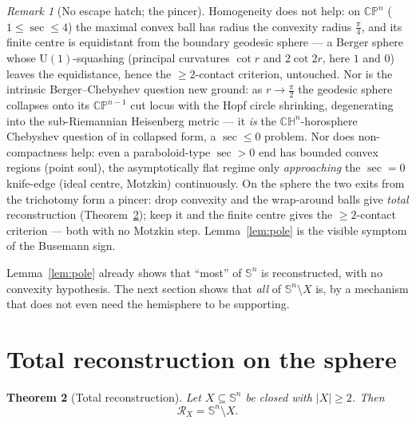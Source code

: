 \documentclass[11pt]{article}
\newtheorem{theorem}{Theorem}[section]
\theoremstyle{remark}
\newtheorem{remark}[theorem]{Remark}
\newcommand{\X}{X}
\newcommand{\Rx}{\mathcal{R}_{\X}}
\newcommand{\Sn}{\mathbb{S}^{n}}
\begin{document}
\begin{remark}[No escape hatch; the pincer]\label{rem:noescape}
Homogeneity does not help: on $\mathbb{CP}^{n}$ ($1\le\sec\le4$) the maximal
convex ball has radius the convexity radius $\tfrac\pi4$, and its finite
centre is equidistant from the boundary geodesic sphere --- a Berger sphere
whose $\mathrm{U}(1)$-squashing (principal curvatures $\cot r$ and
$2\cot 2r$, here $1$ and $0$) leaves the equidistance, hence the
$\ge2$-contact criterion, untouched. Nor is the intrinsic Berger--Chebyshev
question new ground: as $r\to\tfrac\pi2$ the geodesic sphere collapses onto
its $\mathbb{CP}^{n-1}$ cut locus with the Hopf circle shrinking,
degenerating into the sub-Riemannian Heisenberg metric --- it \emph{is} the
$\mathbb{CH}^{n}$-horosphere Chebyshev question of \cite{R3} in collapsed
form, a $\sec\le0$ problem. Nor does non-compactness help: even a
paraboloid-type $\sec>0$ end has bounded convex regions (point soul), the
asymptotically flat regime only \emph{approaching} the $\sec=0$ knife-edge
(ideal centre, Motzkin) continuously. On the sphere the two exits from the
trichotomy form a pincer: drop convexity and the wrap-around balls give
\emph{total} reconstruction (Theorem~\ref{thm:sphere}); keep it and the
finite centre gives the $\ge2$-contact criterion --- both with no Motzkin
step. Lemma~\ref{lem:pole} is the visible symptom of the Busemann sign.
\end{remark}

Lemma~\ref{lem:pole} already shows that ``most'' of $\Sn$ is
reconstructed, with no convexity hypothesis. The next section shows that
\emph{all} of $\Sn\setminus\X$ is, by a mechanism that does not even need
the hemisphere to be supporting.

\section{Total reconstruction on the sphere}\label{sec:total}

\begin{theorem}[Total reconstruction]\label{thm:sphere}
Let $\X\subseteq\Sn$ be closed with $|\X|\ge2$. Then
\[
  \Rx=\Sn\setminus\X.
\]
\end{theorem}
\end{document}
